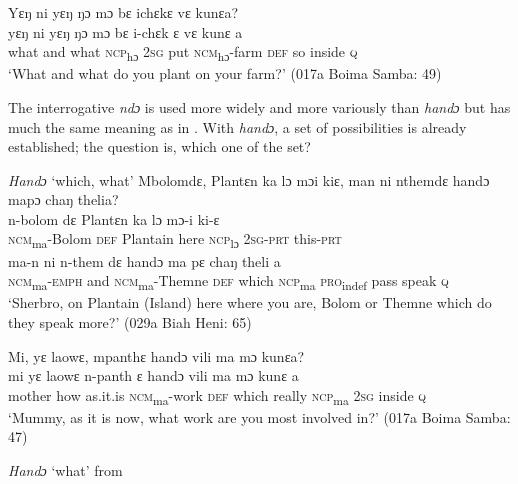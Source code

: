     \ex Yɛŋ ni yɛŋ ŋɔ mɔ bɛ ichɛkɛ vɛ kunɛa?\\
    \gll yɛŋ  ni    yɛŋ  ŋɔ      mɔ  bɛ    i-chɛk      ɛ    vɛ    kunɛ    a\\
    what  and  what  \textsc{ncp}\textsubscript{hɔ}    \textsc{2sg}  put  \textsc{ncm}\textsubscript{hɔ}{}-farm    \textsc{def}  so    inside    \textsc{q}\\
    \glt ‘What and what do you plant on your farm?' (017a Boima Samba: 49)
\z
\z

\newpage
The interrogative \textit{ndɔ} is used more widely and more variously than \textit{handɔ} but has much the same meaning as in . With \textit{handɔ}, a set of possibilities is already established; the question is, which one of the set?

\ea%
    \label{ex:62}
    \textit{Handɔ} ‘which, what' 
    \ea Mbolomdɛ, Plantɛn ka lɔ mɔi kiɛ, man ni  nthemdɛ handɔ mapɔ chaŋ thelia?\\
    \gll n-bolom      dɛ     Plantɛn  ka    lɔ       mɔ-i       ki-ɛ\\
    \textsc{ncm}\textsubscript{ma}{}-Bolom  \textsc{def}  Plantain  here  \textsc{ncp}\textsubscript{lɔ}    \textsc{2sg}{}-\textsc{prt}    this-\textsc{prt}\\
    \gll ma-n        ni    n-them        dɛ    handɔ    ma    pɛ      chaŋ  theli    a\\
    \textsc{ncm}\textsubscript{ma}{}-\textsc{emph}  and  \textsc{ncm}\textsubscript{ma}{}-Themne  \textsc{def}  which  \textsc{ncp}\textsubscript{ma}   \textsc{pro}\textsubscript{indef}  pass  speak    \textsc{q}\\
    \glt ‘Sherbro, on Plantain (Island) here where you are, Bolom or Themne which do they speak more?' (029a Biah Heni: 65)

    \ex Mi, yɛ laowɛ, mpanthɛ handɔ vili ma mɔ kunɛa?\\
    \gll mi        yɛ    laowɛ    n-panth      ɛ    handɔ    vili    ma    mɔ  kunɛ    a\\
    mother    how  as.it.is  \textsc{ncm}\textsubscript{ma}{}-work  \textsc{def}  which  really    \textsc{ncp}\textsubscript{ma}   \textsc{2sg}  inside    \textsc{q}\\
    \glt ‘Mummy, as it is now, what work are you most involved in?' (017a Boima Samba: 47)
\z
\z

\ea%
    \label{ex:63} \textit{Handɔ} ‘what' from \citet{Sumner1921}\\
    
